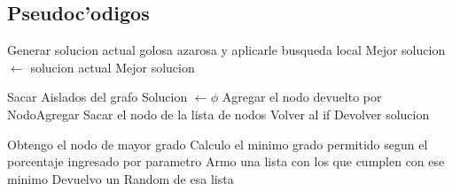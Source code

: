 \subsection{Pseudoc'odigos}

\begin{algorithmic}[1]
	\STATE Generar solucion actual golosa azarosa y aplicarle busqueda local
		\STATE Mejor solucion $\leftarrow$ solucion actual 
	\ENDIF
\ENDWHILE
\RETURN Mejor solucion
\end{algorithmic}

\vspace{2em}

\begin{algorithmic}[1]
\STATE Sacar Aislados del grafo
\STATE Solucion $\leftarrow \phi$
	\STATE Agregar el nodo devuelto por NodoAgregar
	\STATE Sacar el nodo de la lista de nodos
	\STATE Volver al if
\ELSE
	\STATE Devolver solucion
\ENDIF
\end{algorithmic}
	
\vspace{2em}
	
\begin{algorithmic}[1]
\STATE Obtengo el nodo de mayor grado
\STATE Calculo el minimo grado permitido segun el porcentaje ingresado por parametro
\STATE Armo una lista con los que cumplen con ese minimo
\STATE Devuelvo un Random de esa lista
\end{algorithmic}
